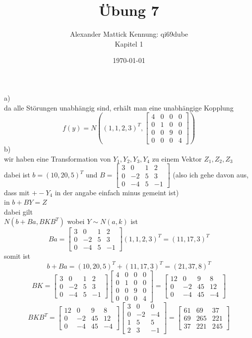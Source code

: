 \documentclass{article}
\author{
Alexander Mattick Kennung: qi69dube\\
Kapitel 1
}
\date{\today}
\title{Übung 7}
\begin{document}
	\maketitle
	a)\\
	da alle Störungen unabhängig sind, erhält man eine unabhängige Kopplung
	\[f(y) = N((1,1,2,3)^T,\begin{bmatrix}4&0&0&0\\0&1&0&0\\0&0&9&0\\0&0&0&4\end{bmatrix})\]
	b)\\
	wir haben eine Transformation von $Y_1,Y_2,Y_3,Y_4$ zu einem Vektor $Z_1,Z_2,Z_3$\\
	dabei ist $b=(10,20,5)^T$ und $B=\begin{bmatrix}3&0&1&2\\0&-2&5&3\\0&-4&5&-1\end{bmatrix}$ (also ich gehe davon aus, dass mit $+-Y_4$ in der angabe einfach minus gemeint ist)\\
	in $b+BY=Z$\\
	dabei gilt\\
	$N(b+Ba,BKB^T)$ wobei $Y\sim N(a,k)$ ist\\
	\[Ba = \begin{bmatrix}3&0&1&2\\0&-2&5&3\\0&-4&5&-1\end{bmatrix}(1,1,2,3)^T = (11,17,3)^T\]
	somit ist
	\[b+Ba = (10,20,5)^T+(11,17,3)^T=(21,37,8)^T\]
	\[BK=\begin{bmatrix}3&0&1&2\\0&-2&5&3\\0&-4&5&-1\end{bmatrix}\begin{bmatrix}4&0&0&0\\0&1&0&0\\0&0&9&0\\0&0&0&4\end{bmatrix}=\begin{bmatrix}12&0&9&8\\0&-2&45&12\\0&-4&45&-4\end{bmatrix}\]
	\[BKB^T = \begin{bmatrix}12&0&9&8\\0&-2&45&12\\0&-4&45&-4\end{bmatrix}
	\begin{bmatrix}
	3&0&0\\
	0&-2&-4\\
	1&5&5\\
	2&3&-1
	\end{bmatrix}=\begin{bmatrix}61&69&37\\69&265&221\\37&221&245\end{bmatrix} \]
\end{document}
